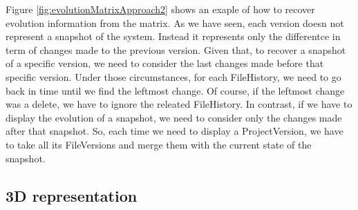Figure  \ref{fig:evolutionMatrixApproach2} shows an exaple of how to recover evolution information from the matrix. 
As we have seen, each version doesn not represent a snapshot of the system.
Instead it represents only the differentce in term of changes made to the previous version. 
Given that, to recover a snapshot of a specific version, we need to consider the last changes made before that specific version.
Under those circumstances, for each FileHistory, we need to go back in time until we find the leftmost change. Of course, if the leftmost change was a delete, we have to ignore the releated FileHistory.
In contrast, if we have to display the evolution of a snapshot, we need to consider only the changes made after that snapshot. 
So, each time we need to display a ProjectVersion, we have to take all its FileVersions and merge them with the current state of the snapshot. 

\subsection*{3D representation}

